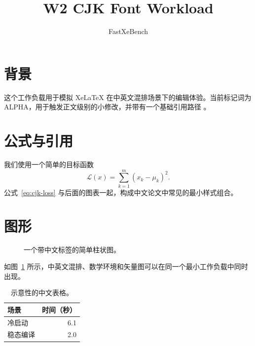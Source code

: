 \documentclass[UTF8]{ctexart}
\title{W2 CJK Font Workload}
\author{FastXeBench}
\date{}
\newcommand{\benchtexttoken}{ALPHA}
\newcommand{\benchfiguretoken}{1.00}
\begin{document}
\maketitle

\section{背景}
这个工作负载用于模拟 XeLaTeX 在中英文混排场景下的编辑体验。当前标记词为 \benchtexttoken，用于触发正文级别的小修改，并带有一个基础引用路径 \cite{refalpha}。

\section{公式与引用}
我们使用一个简单的目标函数
\begin{equation}
\label{eq:cjk-loss}
\mathcal{L}(x) = \sum_{k=1}^{m} \left(x_k - \mu_k\right)^2 .
\end{equation}
公式~\eqref{eq:cjk-loss} 与后面的图表一起，构成中文论文中常见的最小样式组合。

\section{图形}
\begin{figure}[h]
\centering
{}
\caption{一个带中文标签的简单柱状图。}
\label{fig:cjk-bars}
\end{figure}

如图~\ref{fig:cjk-bars} 所示，中英文混排、数学环境和矢量图可以在同一个最小工作负载中同时出现。

\begin{table}[h]
\centering
\begin{tabular}{@{}lr@{}}
\toprule
场景 & 时间（秒） \\
\midrule
冷启动 & 6.1 \\
稳态编译 & 2.0 \\
\bottomrule
\end{tabular}
\caption{示意性的中文表格。}
\end{table}



\end{document}
